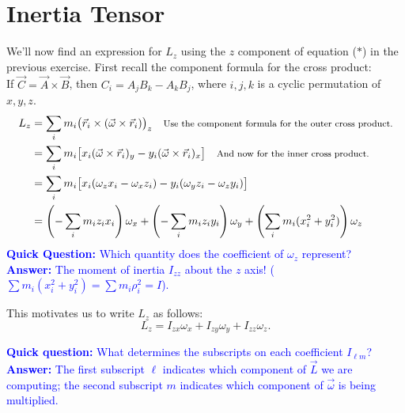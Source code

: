 \documentclass[11pt, letterpaper, openany]{book}
\newenvironment{exercise}[1][Exercise]{%
  \tcolorbox[blanker, breakable, left=1em,
    before skip=1em, after skip=1em,
    borderline west={3pt}{0pt}{PhysNavy},
    colback=PhysCream,
    before upper={\textcolor{PhysNavy}{\sffamily\bfseries #1:}\space}
  ]%
}{%
  \endtcolorbox%
}
\begin{document}
\section*{Inertia Tensor}

\begin{exercise}[Exercise 8]
We'll now find an expression for $L_z$ using the $z$ component of equation ($*$) in the previous exercise. First recall the component formula for the cross product: \\
If $\vec{C} = \vec{A} \times \vec{B}$, then $C_i = A_j B_k - A_k B_j$, where $i, j, k$ is a cyclic permutation of $x, y, z$. \\
\textcolor{blue}{
\begin{align*}
    L_z &= \sum_i m_i \bigl(\vec{r}_i \times (\vec{\omega} \times \vec{r}_i)\bigr)_z \quad \text{\footnotesize{Use the component formula for the outer cross product.}} \\
    &= \sum_i m_i \bigl[ x_i(\vec{\omega} \times \vec{r}_i)_y - y_i(\vec{\omega} \times \vec{r}_i)_x \bigr] \quad \text{\footnotesize{And now for the inner cross product.}} \\
    &= \sum_i m_i \bigl[ x_i(\omega_z x_i - \omega_x z_i) - y_i(\omega_y z_i - \omega_z y_i) \bigr] \\
    &= \left(-\sum_i m_i z_i x_i\right)\omega_x + \left(-\sum_i m_i z_i y_i\right)\omega_y + \left(\sum_i m_i (x_i^2 + y_i^2)\right)\omega_z
\end{align*}
\textbf{Quick Question:} Which quantity does the coefficient of $\omega_z$ represent? \\
\textbf{Answer:} The moment of inertia $I_{zz}$ about the $z$ axis! ($\sum m_i(x_i^2+y_i^2) = \sum m_i \rho_i^2 = I$).
}
\end{exercise}

This motivates us to write $L_z$ as follows:
\[ L_z = I_{zx}\omega_x + I_{zy}\omega_y + I_{zz}\omega_z. \]

\textcolor{blue}{\textbf{Quick question:} What determines the subscripts on each coefficient $I_{\ell m}$? \\
\textbf{Answer:} The first subscript $\ell$ indicates which component of $\vec{L}$ we are computing; the second subscript $m$ indicates which component of $\vec{\omega}$ is being multiplied.}
\end{document}
